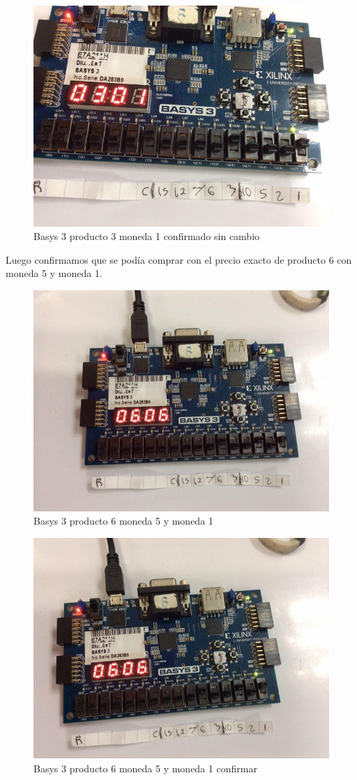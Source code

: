 \documentclass[12pt]{article}  %
\begin{document}
\begin{figure}[!ht]
  \centering
  \caption{Basys 3 producto 3 moneda 1 confirmado sin cambio}
  \includegraphics[width=0.75\linewidth]{Imagenes/Basys/product3-coin1-nochange.png}
\end{figure}

Luego confirmamos que se podía comprar con el precio exacto de producto 6 con moneda 5 y moneda 1.

\newpage

\begin{figure}[!ht]
  \centering
  \caption{Basys 3 producto 6 moneda 5 y moneda 1}
  \includegraphics[width=0.75\linewidth]{Imagenes/Basys/product6-coin6.png}
\end{figure}

\begin{figure}[!ht]
  \centering
  \caption{Basys 3 producto 6 moneda 5 y moneda 1 confirmar}
  \includegraphics[width=0.75\linewidth]{Imagenes/Basys/product6-coin6-confirmed.png}
\end{figure}
\end{document}
